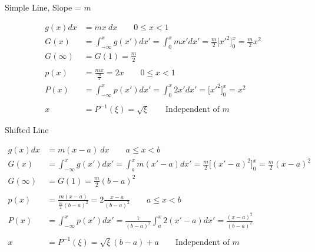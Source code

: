 \documentclass[xcolor=x11names,compress]{beamer}
\renewcommand{\(}{\begin{columns}}
\renewcommand{\)}{\end{columns}}
\newcommand{\<}[1]{\begin{column}{#1}}
\renewcommand{\>}{\end{column}}
\begin{document}
\begin{frame}{Simple Line, Slope = $m$}

\[
  \begin{aligned}
g(x) dx &= mx\:dx \qquad 0 \leq x < 1\\
G(x) &= \int_{-\infty}^x g(x')dx' = \int_0^x mx' dx' = \frac{m}{2}\bigl[x'^2 \bigr]_0^x = \frac{m}{2} x^2\\
    G(\infty) &= G(1) = \frac{m}{2}\\
\\p(x) &= \frac{mx}{\frac{m}{2}} = 2x \qquad 0 \leq x < 1\\
P(x) &= \int_{-\infty}^x p(x')dx' = \int_0^x 2x' dx' = \bigl[x'^2 \bigr]_0^x = x^2\\
    &\\
    x &= P^{-1}(\xi) = \sqrt{\xi} \qquad\text{Independent of }m
  \end{aligned}
\]    
    
\end{frame}


\begin{frame}{Shifted Line}

\[
  \begin{aligned}
  g(x) dx &= m(x - a)\:dx \qquad a \leq x < b\\
  G(x) &= \int_{-\infty}^x g(x')dx' = \int_a^x m(x'-a) dx' = \frac{m}{2}\bigl[(x'-a)^2 \bigr]_0^x = \frac{m}{2} (x-a)^2\\
    G(\infty) &= G(1) = \frac{m}{2}(b-a)^2\\
    \\p(x) &= \frac{m(x-a)}{\frac{m}{2}(b-a)^2} = 2 \frac{x-a}{(b-a)^2}\qquad a \leq x < b\\
    P(x) &= \int_{-\infty}^x p(x')dx' = \frac{1}{(b-a)^2}\int_a^x 2(x'-a) dx' = \frac{(x-a)^2}{(b-a)^2}\\
    &\\
    x &= P^{-1}(\xi) = \sqrt{\xi}(b-a) + a \qquad\text{Independent of }m
  \end{aligned}
\]    
    
\end{frame}
\end{document}

